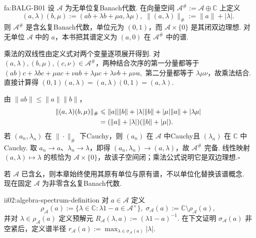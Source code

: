 \begin{FATheorem}[B][单位化]{fa:BALG-B01}
设 \(\displaystyle \mathcal A\) 为无单位复Banach代数. 在向量空间 \(\displaystyle \mathcal A^\#:=\mathcal A\oplus\mathbb C\) 上定义
\[
(a,\lambda)(b,\mu)
:=
(ab+\lambda b+\mu a,\lambda\mu),
\;
\|(a,\lambda)\|_\#:=\|a\|+|\lambda|.
\]
则 \(\displaystyle \mathcal A^\#\) 是含幺复Banach代数，单位元为 \(\displaystyle(0,1)\)，而 \(\displaystyle \mathcal A\times\{0\}\) 是其闭双边理想. 对无单位 \(\displaystyle \mathcal A\) 中的 \(\displaystyle a\)，本书把其谱定义为 \(\displaystyle (a,0)\) 在 \(\displaystyle \mathcal A^\#\) 中的谱.
\end{FATheorem}

\begin{FAProof}
乘法的双线性由定义式对两个变量逐项展开得到. 对 \(\displaystyle (a,\lambda),(b,\mu),(c,\nu)\in\mathcal A^\#\)，两种结合次序的第一分量都等于
\(\displaystyle ( ab)c+\lambda bc+\mu ac+\nu ab+\lambda\mu c+\lambda\nu b+\mu\nu a,\)
第二分量都等于 \(\displaystyle\lambda\mu\nu\)，故乘法结合. 直接计算得 \(\displaystyle(0,1)(a,\lambda)=(a,\lambda)(0,1)=(a,\lambda)\).

由 \(\displaystyle \|ab\|\leqslant\|a\|\|b\|\)，
\[
\begin{aligned}
\displaystyle \|(a,\lambda)(b,\mu)\|_\# &\displaystyle \leqslant \|a\|\|b\|+|\lambda|\|b\|+|\mu|\|a\|+|\lambda\mu|\\
\displaystyle &\displaystyle = (\|a\|+|\lambda|)(\|b\|+|\mu|).
\end{aligned}
\]
若 \(\displaystyle (a_n,\lambda_n)\) 在 \(\displaystyle\|\cdot\|_\#\) 下Cauchy，则 \(\displaystyle(a_n)\) 在 \(\displaystyle\mathcal A\) 中Cauchy且 \(\displaystyle(\lambda_n)\) 在 \(\displaystyle\mathbb C\) 中Cauchy. 取 \(\displaystyle a_n\to a\)、\(\displaystyle\lambda_n\to\lambda\)，即得 \(\displaystyle(a_n,\lambda_n)\to(a,\lambda)\)，故 \(\displaystyle\mathcal A^\#\) 完备. 线性映射 \(\displaystyle (a,\lambda)\mapsto\lambda\) 的核恰为 \(\displaystyle\mathcal A\times\{0\}\)，故该子空间闭；乘法公式说明它是双边理想.\hfill\(\square\)
\end{FAProof}

若 \(\displaystyle \mathcal A\) 已含幺，则本章始终使用其原有单位与原有谱，不以单位化替换该谱概念. 现在固定 \(\displaystyle \mathcal A\) 为非零含幺复Banach代数.

\begin{FADefinition}{ii02:algebra-spectrum-definition}
对 \(\displaystyle a\in\mathcal A\) 定义
\[
\rho_{\mathcal A}(a)
:=
\{\lambda\in\mathbb C:\lambda1-a\in\mathcal A^\times\},
\;
\sigma_{\mathcal A}(a)
:=
\mathbb C\setminus\rho_{\mathcal A}(a),
\]
并对 \(\displaystyle \lambda\in\rho_{\mathcal A}(a)\) 定义预解元 \(\displaystyle R_{\mathcal A}(\lambda,a):=(\lambda1-a)^{-1}\). 在下文证明 \(\displaystyle\sigma_{\mathcal A}(a)\) 非空紧后，定义谱半径
\(\displaystyle r_{\mathcal A}(a):=\max_{\lambda\in\sigma_{\mathcal A}(a)}|\lambda|.\)
\end{FADefinition}

